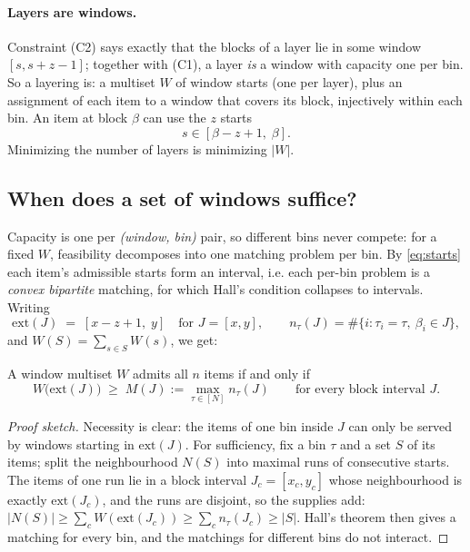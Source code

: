 \paragraph{Layers are windows.}
Constraint (C2) says exactly that the blocks of a layer lie in some window
$[s, s+z-1]$; together with (C1), a layer \emph{is} a window with capacity one
per bin. So a layering is: a multiset $W$ of window starts (one per layer),
plus an assignment of each item to a window that covers its block, injectively
within each bin. An item at block $\beta$ can use the $z$ starts
\begin{equation}
  \label{eq:starts}
  s \in [\beta - z + 1,\; \beta].
\end{equation}
Minimizing the number of layers is minimizing $|W|$.

\subsection{When does a set of windows suffice?}

Capacity is one per \emph{(window, bin)} pair, so different bins never compete:
for a fixed $W$, feasibility decomposes into one matching problem per bin. By
\eqref{eq:starts} each item's admissible starts form an interval, i.e. each
per-bin problem is a \emph{convex bipartite} matching, for which Hall's
condition collapses to intervals. Writing
\[
  \mathrm{ext}(J) \;=\; [x-z+1,\; y]
  \quad\text{for } J = [x,y],
  \qquad
  n_\tau(J) = \#\{i : \tau_i = \tau,\ \beta_i \in J\},
\]
and $W(S) = \sum_{s \in S} W(s)$, we get:

\begin{lemma}
\label{lem:hall}
A window multiset $W$ admits all $n$ items if and only if
\[
  W\big(\mathrm{ext}(J)\big) \;\ge\; M(J) := \max_{\tau \in [N]} n_\tau(J)
  \qquad\text{for every block interval } J .
\]
\end{lemma}

\begin{proof}[Proof sketch]
Necessity is clear: the items of one bin inside $J$ can only be served by
windows starting in $\mathrm{ext}(J)$. For sufficiency, fix a bin $\tau$ and a
set $S$ of its items; split the neighbourhood $N(S)$ into maximal runs of
consecutive starts. The items of one run lie in a block interval
$J_c = [x_c, y_c]$ whose neighbourhood is exactly $\mathrm{ext}(J_c)$, and the
runs are disjoint, so the supplies add: $|N(S)| \ge \sum_c W(\mathrm{ext}(J_c))
\ge \sum_c n_\tau(J_c) \ge |S|$. Hall's theorem then gives a matching for every
bin, and the matchings for different bins do not interact.
\end{proof}

